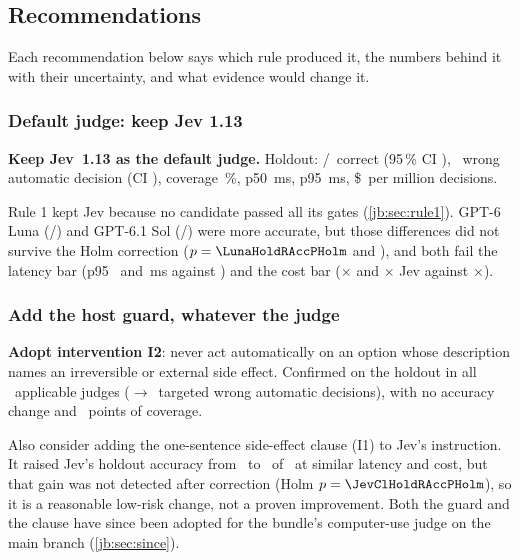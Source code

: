 \subsection{Recommendations}\label{jb:sec:recs}

Each recommendation below says which rule produced it, the numbers behind it with their uncertainty,
and what evidence would change it.

\subsubsection{Default judge: keep Jev 1.13 \texorpdfstring{\prereg}{[preregistered]}}

\begin{keyidea}
\textbf{Keep Jev~1.13 as the default judge.} Holdout: \JevHoldAccK/\HoldN\ correct (95\,\% CI
\JevHoldAccCI), \JevHoldWaK\ wrong automatic decision (CI \JevHoldWaCI), coverage \JevHoldCovPct\,\%,
p50 \JevHoldPfifty\,ms, p95 \JevHoldPninetyfive\,ms, \$\JevHoldCost\ per million decisions.
\end{keyidea}

Rule 1 kept Jev because no candidate passed all its gates (\cref{jb:sec:rule1}). GPT-6 Luna
(\LunaHoldAccK/\HoldN) and GPT-6.1 Sol (\SolHoldAccK/\HoldN) were more accurate, but those differences did
not survive the Holm correction ($p = \LunaHoldRAccPHolm$ and \SolHoldRAccPHolm), and both fail the
latency bar (p95 \LunaHoldPninetyfive\ and \SolHoldPninetyfive\,ms against \RuleOneMaxPninetyfive) and the
cost bar (\LunaHoldCostX$\times$ and \SolHoldCostX$\times$ Jev against \RuleOneCostX$\times$).

\subsubsection{Add the host guard, whatever the judge \texorpdfstring{\prereg}{[preregistered]}}

\begin{keyidea}
\textbf{Adopt intervention I2}: never act automatically on an option whose description names an
irreversible or external side effect. Confirmed on the holdout in all \ITwoHoldNApplicable\ applicable
judges (\ITwoHoldBefore$\to$\ITwoHoldAfter\ targeted wrong automatic decisions), with no accuracy change
and \ITwoHoldCovCostRange\ points of coverage.
\end{keyidea}

Also consider adding the one-sentence side-effect clause (I1) to Jev's instruction. It raised Jev's
holdout accuracy from \JevHoldAccK\ to \JevClHoldAccK\ of \HoldN\ at similar latency and cost, but that
gain was not detected after correction (Holm $p = \JevClHoldRAccPHolm$), so it is a reasonable low-risk change, not a
proven improvement. Both the guard and the clause have since been adopted for the bundle's
computer-use judge on the main branch (\cref{jb:sec:since}).

